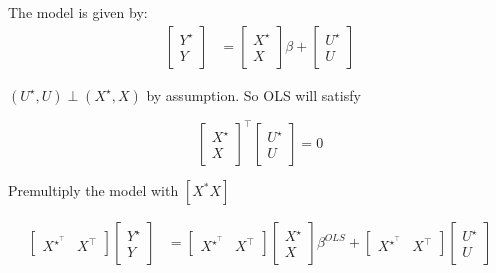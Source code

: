 \documentclass{article}
\begin{document}
The model is given by:
\begin{align*}
    \begin{bmatrix}
    Y^\star \\ Y
    \end{bmatrix} &= \begin{bmatrix}
    X^\star \\ X
    \end{bmatrix}\beta + \begin{bmatrix}
    U^\star \\ U
    \end{bmatrix}
\end{align*} 


$(U^\star, U) \perp (X^\star, X)$ by assumption. So OLS will satisfy 

$$
\begin{bmatrix}
    X^\star \\ X
    \end{bmatrix}^\intercal\begin{bmatrix}
    U^\star \\ U
    \end{bmatrix} = 0 
$$
    
Premultiply the model with $[X^\ast X]$ 
    

\begin{align*}
        \begin{bmatrix}
            X^\star^\intercal & X^\intercal
        \end{bmatrix}  \begin{bmatrix}
    Y^\star \\ Y
    \end{bmatrix} &=         \begin{bmatrix}
            X^\star ^\intercal& X^\intercal
        \end{bmatrix} \begin{bmatrix}
    X^\star \\ X
    \end{bmatrix}\beta^{OLS} +         {\begin{bmatrix}
            X^\star^\intercal & X^\intercal
        \end{bmatrix} \begin{bmatrix}
    U^\star \\ U
    \end{bmatrix}}
\end{align*}
\end{document}
